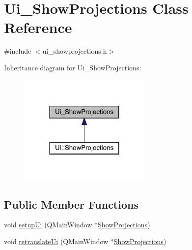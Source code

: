 \hypertarget{class_ui___show_projections}{}\section{Ui\+\_\+\+Show\+Projections Class Reference}
\label{class_ui___show_projections}


{\ttfamily \#include $<$ui\+\_\+showprojections.\+h$>$}



Inheritance diagram for Ui\+\_\+\+Show\+Projections\+:
\nopagebreak
\begin{figure}[H]
\begin{center}
\leavevmode
\includegraphics[width=185pt]{class_ui___show_projections__inherit__graph}
\end{center}
\end{figure}
\subsection*{Public Member Functions}
\begin{DoxyCompactItemize}
\item 
void \mbox{\hyperlink{class_ui___show_projections_af020b59d91ff9201c788d0484ac48dda}{setup\+Ui}} (Q\+Main\+Window $\ast$\mbox{\hyperlink{class_show_projections}{Show\+Projections}})
\item 
void \mbox{\hyperlink{class_ui___show_projections_aa43b9e0a80ae6ac1dd3c4ed5fdae1148}{retranslate\+Ui}} (Q\+Main\+Window $\ast$\mbox{\hyperlink{class_show_projections}{Show\+Projections}})
\end{DoxyCompactItemize}

